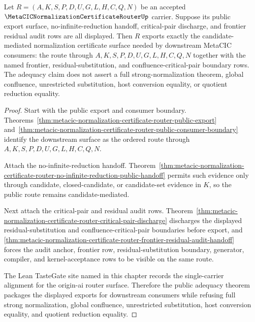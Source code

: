 \begin{theorem}
\label{thm:metacic-normalization-certificate-router-public-adequacy}
Let $R=(A,K,S,P,D,U,G,L,H,C,Q,N)$ be an accepted $\MetaCICNormalizationCertificateRouterUp$ carrier. Suppose its public export surface, no-infinite-reduction handoff, critical-pair discharge, and frontier residual audit rows are all displayed. Then $R$ exports exactly the candidate-mediated normalization certificate surface needed by downstream MetaCIC consumers: the route through $A,K,S,P,D,U,G,L,H,C,Q,N$ together with the named frontier, residual-substitution, and confluence-critical-pair boundary rows. The adequacy claim does not assert a full strong-normalization theorem, global confluence, unrestricted substitution, host conversion equality, or quotient reduction equality.
\end{theorem}
\begin{proof}
Start with the public export and consumer boundary. Theorems~\ref{thm:metacic-normalization-certificate-router-public-export} and~\ref{thm:metacic-normalization-certificate-router-public-consumer-boundary} identify the downstream surface as the ordered route through $A,K,S,P,D,U,G,L,H,C,Q,N$.

Attach the no-infinite-reduction handoff. Theorem~\ref{thm:metacic-normalization-certificate-router-no-infinite-reduction-public-handoff} permits such evidence only through candidate, closed-candidate, or candidate-set evidence in $K$, so the public route remains candidate-mediated.

Next attach the critical-pair and residual audit rows. Theorem~\ref{thm:metacic-normalization-certificate-router-critical-pair-discharge} discharges the displayed residual-substitution and confluence-critical-pair boundaries before export, and \autoref{thm:metacic-normalization-certificate-router-frontier-residual-audit-handoff} forces the audit anchor, frontier row, residual-substitution boundary, generator, compiler, and kernel-acceptance rows to be visible on the same route.

The Lean TasteGate site named in this chapter records the single-carrier alignment for the origin-ai router surface. Therefore the public adequacy theorem packages the displayed exports for downstream consumers while refusing full strong normalization, global confluence, unrestricted substitution, host conversion equality, and quotient reduction equality.
\end{proof}

